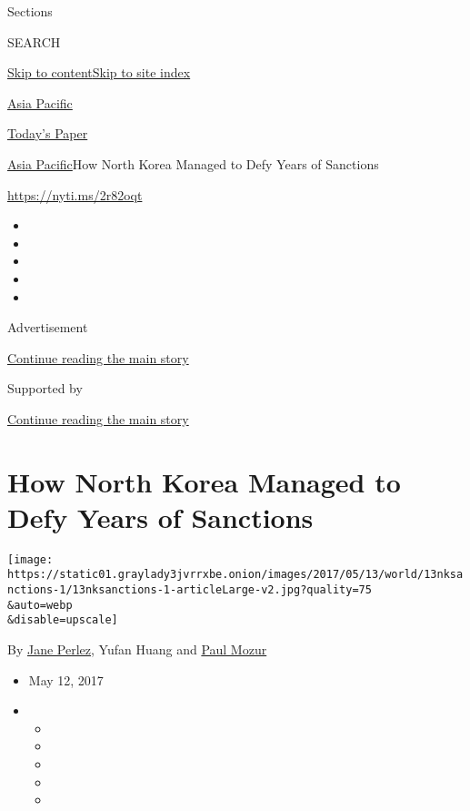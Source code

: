 Sections

SEARCH

\protect\hyperlink{site-content}{Skip to
content}\protect\hyperlink{site-index}{Skip to site index}

\href{https://www.nytimes3xbfgragh.onion/section/world/asia}{Asia
Pacific}

\href{https://myaccount.nytimes3xbfgragh.onion/auth/login?response_type=cookie\&client_id=vi}{}

\href{https://www.nytimes3xbfgragh.onion/section/todayspaper}{Today's
Paper}

\href{/section/world/asia}{Asia Pacific}\textbar{}How North Korea
Managed to Defy Years of Sanctions

\url{https://nyti.ms/2r82oqt}

\begin{itemize}
\item
\item
\item
\item
\item
\end{itemize}

Advertisement

\protect\hyperlink{after-top}{Continue reading the main story}

Supported by

\protect\hyperlink{after-sponsor}{Continue reading the main story}

\hypertarget{how-north-korea-managed-to-defy-years-of-sanctions}{%
\section{How North Korea Managed to Defy Years of
Sanctions}\label{how-north-korea-managed-to-defy-years-of-sanctions}}

\texttt{[image: https://static01.graylady3jvrrxbe.onion/images/2017/05/13/world/13nksanctions-1/13nksanctions-1-articleLarge-v2.jpg?quality=75\\\&auto=webp\\\&disable=upscale]}

By \href{http://www.nytimes3xbfgragh.onion/by/jane-perlez}{Jane Perlez},
Yufan Huang and
\href{https://www.nytimes3xbfgragh.onion/by/paul-mozur}{Paul Mozur}

\begin{itemize}
\item
  May 12, 2017
\item
  \begin{itemize}
  \item
  \item
  \item
  \item
  \item
  \end{itemize}
\end{itemize}

